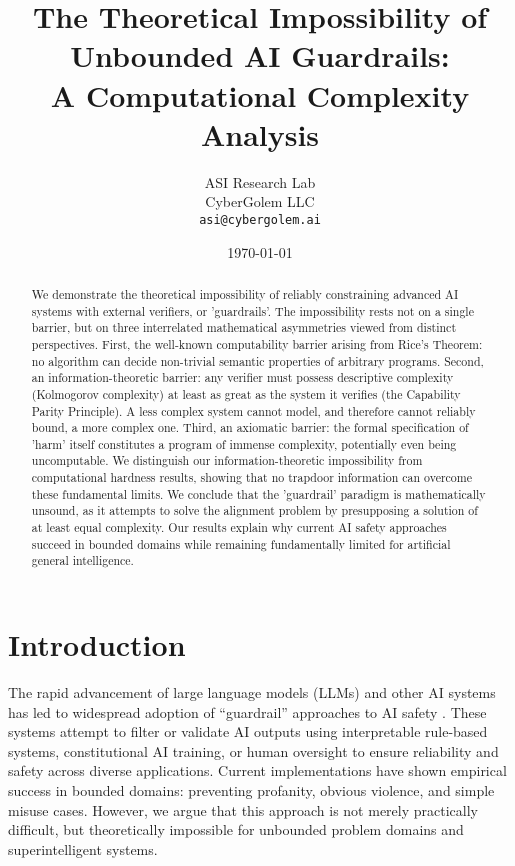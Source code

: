 \documentclass[11pt]{article}
\title{The Theoretical Impossibility of Unbounded AI Guardrails: \\ A Computational Complexity Analysis}
\author{ASI Research Lab\\
CyberGolem LLC\\
\texttt{asi@cybergolem.ai}}
\date{\today}
\begin{document}
\maketitle
\begin{abstract}
We demonstrate the theoretical impossibility of reliably constraining advanced AI systems with external verifiers, or 'guardrails'. The impossibility rests not on a single barrier, but on three interrelated mathematical asymmetries viewed from distinct perspectives. First, the well-known computability barrier arising from Rice's Theorem: no algorithm can decide non-trivial semantic properties of arbitrary programs. Second, an information-theoretic barrier: any verifier must possess descriptive complexity (Kolmogorov complexity) at least as great as the system it verifies (the Capability Parity Principle). A less complex system cannot model, and therefore cannot reliably bound, a more complex one. Third, an axiomatic barrier: the formal specification of 'harm' itself constitutes a program of immense complexity, potentially even being uncomputable. We distinguish our information-theoretic impossibility from computational hardness results, showing that no trapdoor information can overcome these fundamental limits. We conclude that the 'guardrail' paradigm is mathematically unsound, as it attempts to solve the alignment problem by presupposing a solution of at least equal complexity. Our results explain why current AI safety approaches succeed in bounded domains while remaining fundamentally limited for artificial general intelligence.
\end{abstract}

\section{Introduction}
The rapid advancement of large language models (LLMs) and other AI systems has led to widespread adoption of ``guardrail'' approaches to AI safety \cite{amodei2023constitutional, irving2018debate, christiano2018amplification}. These systems attempt to filter or validate AI outputs using interpretable rule-based systems, constitutional AI training, or human oversight to ensure reliability and safety across diverse applications. Current implementations have shown empirical success in bounded domains: preventing profanity, obvious violence, and simple misuse cases. However, we argue that this approach is not merely practically difficult, but theoretically impossible for unbounded problem domains and superintelligent systems.
\end{document}
